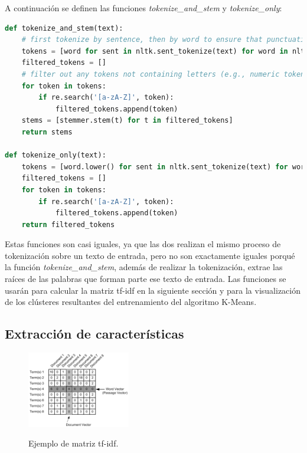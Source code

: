 \documentclass{uimppracticas}
\begin{document}
A continuación se definen las funciones \textit{tokenize\_and\_stem} y \textit{tokenize\_only}: 

\begin{lstlisting}[language=python]
def tokenize_and_stem(text):
	# first tokenize by sentence, then by word to ensure that punctuation is caught as it's own token
	tokens = [word for sent in nltk.sent_tokenize(text) for word in nltk.word_tokenize(sent)]
	filtered_tokens = []
	# filter out any tokens not containing letters (e.g., numeric tokens, raw punctuation)
	for token in tokens:
		if re.search('[a-zA-Z]', token):
			filtered_tokens.append(token)
	stems = [stemmer.stem(t) for t in filtered_tokens]
	return stems
	
def tokenize_only(text):
	tokens = [word.lower() for sent in nltk.sent_tokenize(text) for word in nltk.word_tokenize(sent)]
	filtered_tokens = []
	for token in tokens:
		if re.search('[a-zA-Z]', token):
			filtered_tokens.append(token)
	return filtered_tokens  
\end{lstlisting}

Estas funciones son casi iguales, ya que las dos realizan el mismo proceso de tokenización sobre un texto de entrada, pero no son exactamente iguales porqué la función \textit{tokenize\_and\_stem}, además de realizar la tokenización, extrae las raíces de las palabras que forman parte ese texto de entrada. Las funciones se usarán para calcular la matriz tf-idf en la siguiente sección y para la visualización de los clústeres resultantes del entrenamiento del algoritmo K-Means.

\subsection{Extracción de características}

\begin{figure}
	\centering
	\caption{Ejemplo de matriz tf-idf.}
	\includegraphics[width=0.4\textwidth]{images/matrix}
	\label{matrix}
\end{figure}
\end{document}
